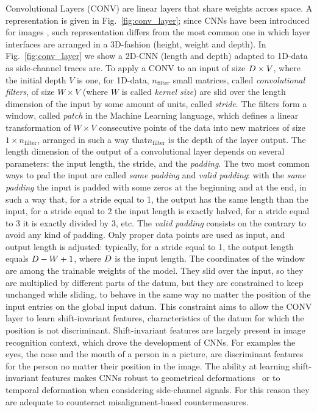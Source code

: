 Convolutional Layers (CONV) are linear layers that share weights across space. A representation is given in Fig.~\ref{fig:conv_layer}; since CNNs have been introduced for images \cite{lecun1995convolutional}, such representation differs from the most common one in which layer interfaces are arranged in a 3D-fashion (height, weight and depth). In Fig.~\ref{fig:conv_layer} we show a 2D-CNN (length and depth) adapted to 1D-data as side-channel traces are. To apply a CONV to an input of size $D\times V$, where the initial depth $V$ is one, for 1D-data,
$n_{\text{filter}}$ small matrices, called \emph{convolutional filters}, of
size $W\times V$ (where $W$ is called \emph{kernel size}) are slid over 
the length dimension of the input by some amount of units, called \emph{stride}. 
The filters form a window, called \emph{patch} in the Machine Learning language, which defines a
linear transformation of $W\times V$ consecutive points of the data into new
matrices of size $1\times n_{\text{filter}}$, arranged in such a way that$ n_{\text{filter}}$ is the depth of the layer output. The length dimension of the output of a convolutional layer depends on several parameters: the input length, the stride, and the \emph{padding}. The two most common ways to pad the input are called \emph{same padding} and \emph{valid padding}: with the \emph{same padding} the input is padded with some zeros at the beginning and at the end, in such a way that, for a stride equal to 1, the output has the same
length than the input, for a stride equal to 2 the input length is exactly halved, for a stride equal to 3 it is exactly divided by 3, etc.  The \emph{valid padding} consists on the contrary to avoid any kind of padding. Only proper data points are used as input, and output length is adjusted: typically, for a stride equal to 1, the output length equals $D - W +1$, where $D$ is the input length. The
coordinates of the window are among the trainable weights of the model. They slid over the input, so they are multiplied by different parts of the datum, but  they are constrained to keep unchanged while sliding, \ie to behave in the same way no matter the position of the input entries on the global input datum. This constraint aims to allow the CONV layer to
learn shift-invariant features, \ie characteristics of the datum for which the position is not discriminant. Shift-invariant features are largely present in image recognition context, which drove the development of CNNs. For examples the eyes, the nose and the mouth of a person in a picture, are discriminant features for the person no matter their position in the image. The ability at learning shift-invariant features makes CNNs robust to
geometrical deformations~\cite{lecun1995convolutional} or to temporal deformation when considering side-channel signals. For this reason they are adequate to counteract misalignment-based countermeasures.


